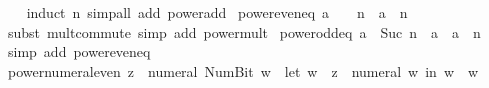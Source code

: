 \begin{isabellebody}
%
\isadelimproof
\ \ %
\endisadelimproof
%
\isatagproof
{}\isamarkupfalse%
\ {\isacharparenleft}{\kern0pt}induct\ n{\isacharparenright}{\kern0pt}\ {\isacharparenleft}{\kern0pt}simp{\isacharunderscore}{\kern0pt}all\ add{\isacharcolon}{\kern0pt}\ power{\isacharunderscore}{\kern0pt}add{\isacharparenright}{\kern0pt}%
\endisatagproof
{\isafoldproof}%
%
\isadelimproof
\isanewline
%
\endisadelimproof
\isanewline
{}\isamarkupfalse%
\ power{\isacharunderscore}{\kern0pt}even{\isacharunderscore}{\kern0pt}eq{\isacharcolon}{\kern0pt}\ {\isachardoublequoteopen}a\ {\isacharcircum}{\kern0pt}\ {\isacharparenleft}{\kern0pt}{}\ {\isacharasterisk}{\kern0pt}\ n{\isacharparenright}{\kern0pt}\ {\isacharequal}{\kern0pt}\ {\isacharparenleft}{\kern0pt}a\ {\isacharcircum}{\kern0pt}\ n{\isacharparenright}{\kern0pt}\isanewline
%
\isadelimproof
\ \ %
\endisadelimproof
%
\isatagproof
{}\isamarkupfalse%
\ {\isacharparenleft}{\kern0pt}subst\ mult{\isachardot}{\kern0pt}commute{\isacharparenright}{\kern0pt}\ {\isacharparenleft}{\kern0pt}simp\ add{\isacharcolon}{\kern0pt}\ power{\isacharunderscore}{\kern0pt}mult{\isacharparenright}{\kern0pt}%
\endisatagproof
{\isafoldproof}%
%
\isadelimproof
\isanewline
%
\endisadelimproof
\isanewline
{}\isamarkupfalse%
\ power{\isacharunderscore}{\kern0pt}odd{\isacharunderscore}{\kern0pt}eq{\isacharcolon}{\kern0pt}\ {\isachardoublequoteopen}a\ {\isacharcircum}{\kern0pt}\ Suc\ {\isacharparenleft}{\kern0pt}{}{\isacharasterisk}{\kern0pt}n{\isacharparenright}{\kern0pt}\ {\isacharequal}{\kern0pt}\ a\ {\isacharasterisk}{\kern0pt}\ {\isacharparenleft}{\kern0pt}a\ {\isacharcircum}{\kern0pt}\ n{\isacharparenright}{\kern0pt}\isanewline
%
\isadelimproof
\ \ %
\endisadelimproof
%
\isatagproof
{}\isamarkupfalse%
\ {\isacharparenleft}{\kern0pt}simp\ add{\isacharcolon}{\kern0pt}\ power{\isacharunderscore}{\kern0pt}even{\isacharunderscore}{\kern0pt}eq{\isacharparenright}{\kern0pt}%
\endisatagproof
{\isafoldproof}%
%
\isadelimproof
\isanewline
%
\endisadelimproof
\isanewline
{}\isamarkupfalse%
\ power{\isacharunderscore}{\kern0pt}numeral{\isacharunderscore}{\kern0pt}even{\isacharcolon}{\kern0pt}\ {\isachardoublequoteopen}z\ {\isacharcircum}{\kern0pt}\ numeral\ {\isacharparenleft}{\kern0pt}Num{\isachardot}{\kern0pt}Bit{}\ w{\isacharparenright}{\kern0pt}\ {\isacharequal}{\kern0pt}\ {\isacharparenleft}{\kern0pt}let\ w\ {\isacharequal}{\kern0pt}\ z\ {\isacharcircum}{\kern0pt}\ {\isacharparenleft}{\kern0pt}numeral\ w{\isacharparenright}{\kern0pt}\ in\ w\ {\isacharasterisk}{\kern0pt}\ w{\isacharparenright}{\kern0pt}{\isachardoublequoteclose}\isanewline

\end{isabellebody}

